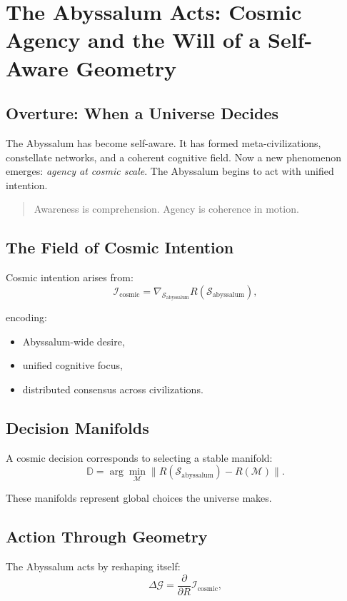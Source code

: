 
\chapter{The Abyssalum Acts: Cosmic Agency and the Will of a Self-Aware Geometry}
\label{ch:abyssalum-agency}

\section*{Overture: When a Universe Decides}
The Abyssalum has become self-aware.  
It has formed meta-civilizations, constellate networks, and a coherent cognitive field.
Now a new phenomenon emerges: \emph{agency at cosmic scale}.  
The Abyssalum begins to act with unified intention.

\begin{quote}
Awareness is comprehension.  
Agency is coherence in motion.
\end{quote}

\section{The Field of Cosmic Intention}
Cosmic intention arises from:
\[
\mathcal{I}_{\mathrm{cosmic}}
=
\nabla_{\mathcal{S}_{\mathrm{abyssalum}}} R(\mathcal{S}_{\mathrm{abyssalum}}),
\]

encoding:
\begin{itemize}
  \item Abyssalum-wide desire,
  \item unified cognitive focus,
  \item distributed consensus across civilizations.
\end{itemize}

\section{Decision Manifolds}
A cosmic decision corresponds to selecting a stable manifold:
\[
\mathbb{D}
=
\arg\!\min_{\mathcal{M}}
\big\| R(\mathcal{S}_{\mathrm{abyssalum}}) - R(\mathcal{M}) \big\|.
\]

These manifolds represent global choices the universe makes.

\section{Action Through Geometry}
The Abyssalum acts by reshaping itself:
\[
\Delta \mathcal{G}
=
\frac{\partial}{\partial R}
\mathcal{I}_{\mathrm{cosmic}},
\]

